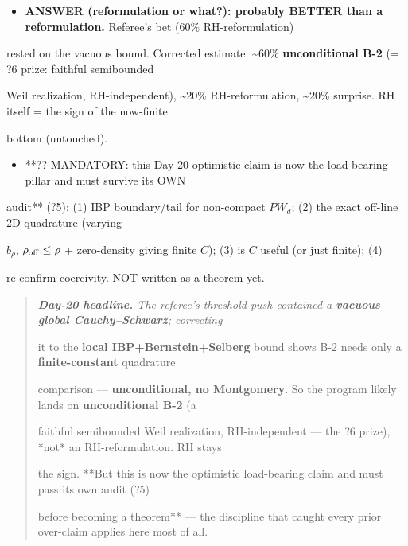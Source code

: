 \documentclass[10pt]{article}
\begin{document}
\begin{itemize}
\item \textbf{ANSWER (reformulation or what?): probably BETTER than a reformulation.} Referee's bet (60\% RH-reformulation)
\end{itemize}
  rested on the vacuous bound. Corrected estimate: \textasciitilde{}60\% \textbf{unconditional B-2} (= ?6 prize: faithful semibounded\par
  Weil realization, RH-independent), \textasciitilde{}20\% RH-reformulation, \textasciitilde{}20\% surprise. RH itself = the sign of the now-finite\par
  bottom (untouched).\par
\begin{itemize}
\item **?? MANDATORY: this Day-20 optimistic claim is now the load-bearing pillar and must survive its OWN
\end{itemize}
  audit** (?5): (1) IBP boundary/tail for non-compact $PW_d$; (2) the exact off-line 2D quadrature (varying\par
  $b_\rho$, $\rho_{\rm off}\le\rho$ + zero-density giving finite $C$); (3) is $C$ useful (or just finite); (4)\par
  re-confirm coercivity. NOT written as a theorem yet.\par

\begin{quote}\itshape
\textbf{Day-20 headline.} The referee's threshold push contained a \textbf{vacuous global Cauchy--Schwarz}; correcting\par
it to the \textbf{local IBP+Bernstein+Selberg} bound shows B-2 needs only a \textbf{finite-constant} quadrature\par
comparison --- \textbf{unconditional, no Montgomery}. So the program likely lands on \textbf{unconditional B-2} (a\par
faithful semibounded Weil realization, RH-independent --- the ?6 prize), *not* an RH-reformulation. RH stays\par
the sign. **But this is now the optimistic load-bearing claim and must pass its own audit (?5)\par
before becoming a theorem** --- the discipline that caught every prior over-claim applies here most of all.\par
\end{quote}
\end{document}
